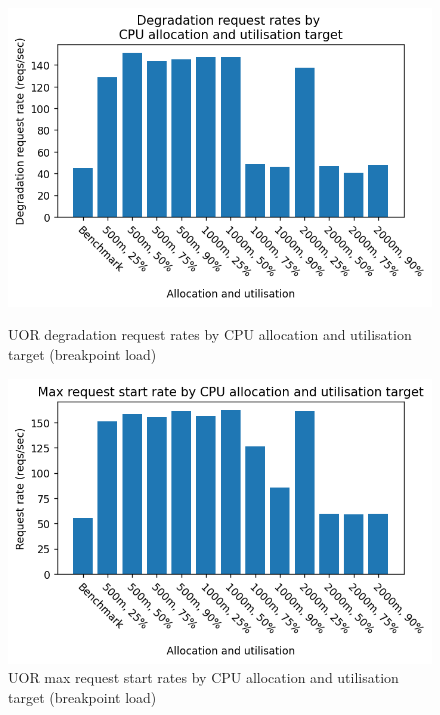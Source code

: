 \begin{figure}[h]
    \centering
    \begin{minipage}{.45\textwidth}
        \centering
        \includegraphics[width=\linewidth]{figures/uor-rau-breakpoint-degradation-reqs.png}
        \caption{UOR degradation request rates by CPU allocation and utilisation target (breakpoint load)}
        \label{figure:uor-resource-allocation-deg-comp-breakpoint}
    \end{minipage}%
    \hspace{0.05\textwidth} %
    \begin{minipage}{.45\textwidth}
      \centering
      \includegraphics[width=\linewidth]{figures/uor-rau-breakpoint-max-request-rate.png}

      \caption{UOR max request start rates by CPU allocation and utilisation target (breakpoint load)}
      \label{figure:uor-resource-allocation-breakpoint-max-start-rates}
    \end{minipage}
\end{figure}

